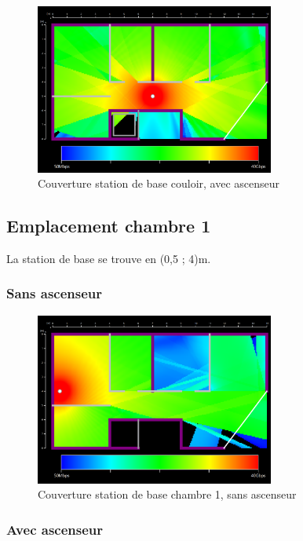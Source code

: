 \begin{figure}[H]
    \centering
    \includegraphics[width=0.7\textwidth]{latex/images/highres-couloir-with-lift.png}
    \caption{Couverture station de base couloir, avec ascenseur}
    \label{fig:simu-emplacement-couloir-avecasc}
\end{figure}


\subsection{Emplacement chambre 1}
La station de base se trouve en (0,5 ; 4)m.

\subsubsection{Sans ascenseur}

\begin{figure}[H]
    \centering
    \includegraphics[width=0.7\textwidth]{latex/images/highres-chambre1-without-lift.png}
    \caption{Couverture station de base chambre 1, sans ascenseur}
    \label{fig:simu-emplacement-chambre1-sansasc}
\end{figure}
\subsubsection{Avec ascenseur}

